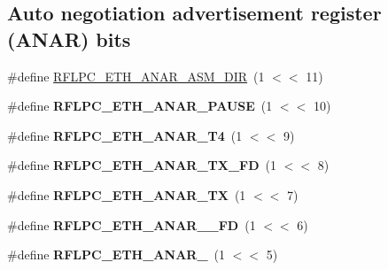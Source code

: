 \subsection*{Auto negotiation advertisement register (A\-N\-A\-R) bits}
\begin{DoxyCompactItemize}
\item 
\#define \hyperlink{group__eth_ga76e2d7b1c3a579fbfa1df91798d91538}{R\-F\-L\-P\-C\-\_\-\-E\-T\-H\-\_\-\-A\-N\-A\-R\-\_\-\-A\-S\-M\-\_\-\-D\-I\-R}~(1 $<$$<$ 11)
\item 
\hypertarget{group__eth_gafa984288ad56d7765b7657290c955e60}{\#define {\bfseries R\-F\-L\-P\-C\-\_\-\-E\-T\-H\-\_\-\-A\-N\-A\-R\-\_\-\-P\-A\-U\-S\-E}~(1 $<$$<$ 10)}\label{group__eth_gafa984288ad56d7765b7657290c955e60}

\item 
\hypertarget{group__eth_ga941370cba8f8132fa8b9e426abbdee7c}{\#define {\bfseries R\-F\-L\-P\-C\-\_\-\-E\-T\-H\-\_\-\-A\-N\-A\-R\-\_\-\-T4}~(1 $<$$<$ 9)}\label{group__eth_ga941370cba8f8132fa8b9e426abbdee7c}

\item 
\hypertarget{group__eth_ga15e1ec2646d27d7bdff059cdb9eb01c0}{\#define {\bfseries R\-F\-L\-P\-C\-\_\-\-E\-T\-H\-\_\-\-A\-N\-A\-R\-\_\-\-T\-X\-\_\-\-F\-D}~(1 $<$$<$ 8)}\label{group__eth_ga15e1ec2646d27d7bdff059cdb9eb01c0}

\item 
\hypertarget{group__eth_ga74476594da6025e94adeaa594114c7c1}{\#define {\bfseries R\-F\-L\-P\-C\-\_\-\-E\-T\-H\-\_\-\-A\-N\-A\-R\-\_\-\-T\-X}~(1 $<$$<$ 7)}\label{group__eth_ga74476594da6025e94adeaa594114c7c1}

\item 
\hypertarget{group__eth_ga26901c02f3acd3fe9e7d9272bca334aa}{\#define {\bfseries R\-F\-L\-P\-C\-\_\-\-E\-T\-H\-\_\-\-A\-N\-A\-R\-\_\-\_\-\-F\-D}~(1 $<$$<$ 6)}\label{group__eth_ga26901c02f3acd3fe9e7d9272bca334aa}

\item 
\hypertarget{group__eth_gaa2580df685fc6837e8c8aabf263135eb}{\#define {\bfseries R\-F\-L\-P\-C\-\_\-\-E\-T\-H\-\_\-\-A\-N\-A\-R\-\_}~(1 $<$$<$ 5)}\label{group__eth_gaa2580df685fc6837e8c8aabf263135eb}

\end{DoxyCompactItemize}
